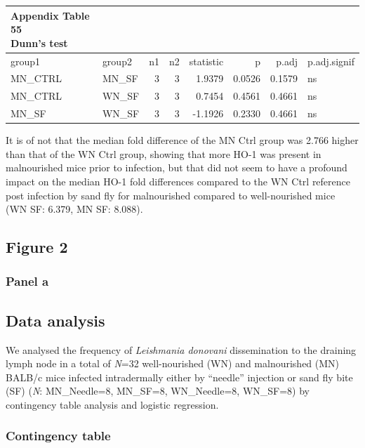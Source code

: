 \documentclass[
  12pt,
  letterpaper,
]{article}
\begin{document}
\begingroup
\fontsize{12.0pt}{14.4pt}\selectfont
\begin{longtable}{llrrrrrl}
\caption*{
{\large \textbf{Appendix Table 55}} \\ 
{\small \textbf{Dunn's test}}
} \\ 
\toprule
{group1} & {group2} & {n1} & {n2} & {statistic} & {p} & {p.adj} & {p.adj.signif} \\ 
\midrule\addlinespace[2.5pt]
MN\_CTRL & MN\_SF & 3 & 3 & 1.9379 & 0.0526 & 0.1579 & ns \\ 
MN\_CTRL & WN\_SF & 3 & 3 & 0.7454 & 0.4561 & 0.4661 & ns \\ 
MN\_SF & WN\_SF & 3 & 3 & -1.1926 & 0.2330 & 0.4661 & ns \\ 
\bottomrule
\end{longtable}
\endgroup

It is of not that the median fold difference of the MN Ctrl group was 2.766 higher than that of the WN Ctrl group, showing that more HO-1 was present in malnourished mice prior to infection, but that did not seem to have a profound impact on the median HO-1 fold differences compared to the WN Ctrl reference post infection by sand fly for malnourished compared to well-nourished mice (WN SF: 6.379, MN SF: 8.088).

\subsection{Figure 2}\label{figure-2}

\subsubsection{Panel a}\label{panel-a}

\subsection{Data analysis}\label{data-analysis-2}

We analysed the frequency of \emph{Leishmania donovani} dissemination to the draining lymph node in a total of \emph{N}=32 well-nourished (WN) and malnourished (MN) BALB/c mice infected intradermally either by ``needle'' injection or sand fly bite (SF) (\emph{N}: MN\_Needle=8, MN\_SF=8, WN\_Needle=8, WN\_SF=8) by contingency table analysis and logistic regression.

\subsubsection{Contingency table}\label{contingency-table}
\end{document}
